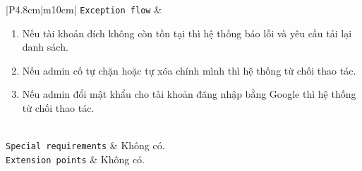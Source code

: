 \begin{longtable}{|P{4.8cm}|m{10cm}|}
	\hline
	\texttt{Exception flow} &
	\begin{enumerate}[label = E\arabic*:]
		\item Nếu tài khoản đích không còn tồn tại thì hệ thống báo lỗi và yêu cầu tải lại danh sách.
		\item Nếu admin cố tự chặn hoặc tự xóa chính mình thì hệ thống từ chối thao tác.
		\item Nếu admin đổi mật khẩu cho tài khoản đăng nhập bằng Google thì hệ thống từ chối thao tác.
	\end{enumerate}
	\\
	\hline
	\texttt{Special requirements} & Không có.\\
	\hline
	\texttt{Extension points} & Không có.\\
	\hline

	\caption{\label{table11}Đặc tả cho Use-case Quản lý tài khoản người dùng}
\end{longtable}